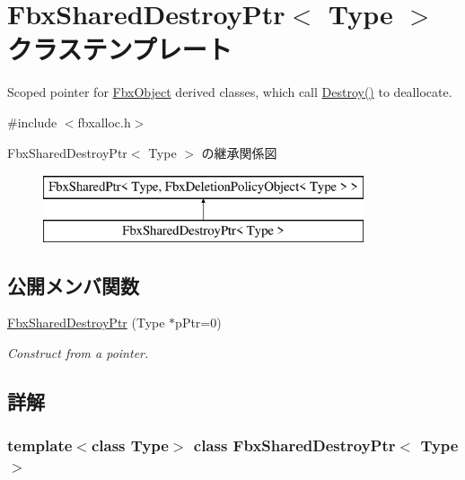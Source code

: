 \hypertarget{class_fbx_shared_destroy_ptr}{}\section{Fbx\+Shared\+Destroy\+Ptr$<$ Type $>$ クラステンプレート}
\label{class_fbx_shared_destroy_ptr}


Scoped pointer for \hyperlink{class_fbx_object}{Fbx\+Object} derived classes, which call \hyperlink{class_fbx_shared_ptr_a706fe3ede6f8a43589348169f4803c75}{Destroy()} to deallocate.  




{\ttfamily \#include $<$fbxalloc.\+h$>$}

Fbx\+Shared\+Destroy\+Ptr$<$ Type $>$ の継承関係図\begin{figure}[H]
\begin{center}
\leavevmode
\includegraphics[height=2.000000cm]{class_fbx_shared_destroy_ptr}
\end{center}
\end{figure}
\subsection*{公開メンバ関数}
\begin{DoxyCompactItemize}
\item 
\hyperlink{class_fbx_shared_destroy_ptr_a5868fc6cf021e68d1100c9aaaf6bf7e7}{Fbx\+Shared\+Destroy\+Ptr} (Type $\ast$p\+Ptr=0)
\begin{DoxyCompactList}\small\item\em Construct from a pointer. \end{DoxyCompactList}\end{DoxyCompactItemize}


\subsection{詳解}
\subsubsection*{template$<$class Type$>$\newline
class Fbx\+Shared\+Destroy\+Ptr$<$ Type $>$}

